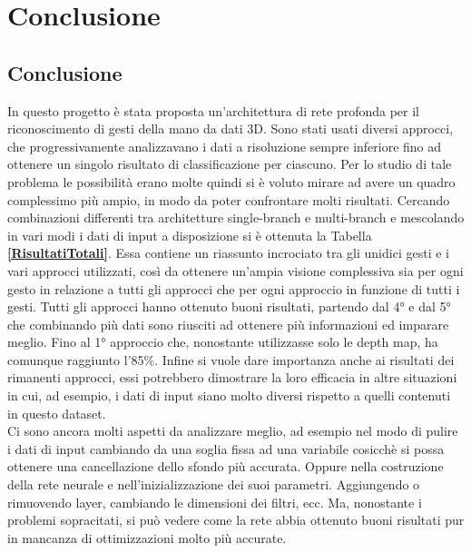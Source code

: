 \chapter{Conclusione}
\label{Conclusione}
\section{Conclusione}

In questo progetto è stata proposta un'architettura di rete profonda per il riconoscimento di gesti della mano da dati 3D. Sono stati usati diversi approcci, che progressivamente analizzavano i dati a risoluzione sempre inferiore fino ad ottenere un singolo risultato di classificazione per ciascuno. Per lo studio di tale problema le possibilità erano molte quindi si è voluto mirare ad avere un quadro complessimo più ampio, in modo da poter confrontare molti risultati. Cercando combinazioni differenti tra architetture single-branch e multi-branch e mescolando in vari modi i dati di input a disposizione si è ottenuta la Tabella \textbf{\ref{RisultatiTotali}}. Essa contiene un riassunto incrociato tra gli unidici gesti e i vari approcci utilizzati, così da ottenere un'ampia visione complessiva sia per ogni gesto in relazione a tutti gli approcci che per ogni approccio in funzione di tutti i gesti.
Tutti gli approcci hanno ottenuto buoni risultati, partendo dal 4° e dal 5° che combinando più dati sono riusciti ad ottenere più informazioni ed imparare meglio. Fino al 1° approccio che, nonostante utilizzasse solo le depth map, ha comunque raggiunto l'85\%. Infine si vuole dare importanza anche ai risultati dei rimanenti approcci, essi potrebbero dimostrare la loro efficacia in altre situazioni in cui, ad esempio, i dati di input siano molto diversi rispetto a quelli contenuti in questo dataset.\\

Ci sono ancora molti aspetti da analizzare meglio, ad esempio nel modo di pulire i dati di input cambiando da una soglia fissa ad una variabile cosicchè si possa ottenere una cancellazione dello sfondo più accurata. Oppure nella costruzione della rete neurale e nell'inizializzazione dei suoi parametri. Aggiungendo o rimuovendo layer, cambiando le dimensioni dei filtri, ecc.
Ma, nonostante i problemi sopracitati, si può vedere come la rete abbia ottenuto buoni risultati pur in mancanza di ottimizzazioni molto più accurate. \\

